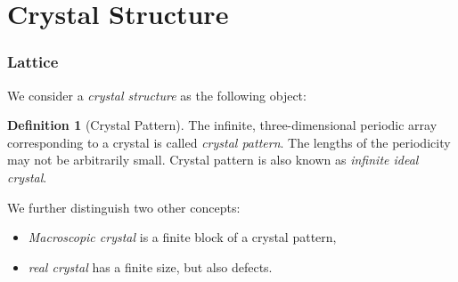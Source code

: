 \documentclass{amsart}
\newtheorem*{lemma}{Lemma}
\theoremstyle{remark}
\theoremstyle{remark}
\theoremstyle{definition}
\newtheorem*{definition}{Definition}
\DeclareMathOperator{\AO}{AO}
\begin{document}

\newpage
\part{Crystal Structure}
\section*{Lattice}
We consider a \emph{crystal structure} as the following object:
\begin{definition}
    [Crystal Pattern]
    The infinite, three-dimensional periodic array corresponding to a crystal is called \emph{crystal pattern}.
    The lengths of the periodicity may not be arbitrarily small. Crystal pattern is also known 
    as \emph{infinite ideal crystal}.
\end{definition}
We further distinguish two other concepts:
\begin{itemize}
    \item \emph{Macroscopic crystal} is a finite block of a crystal pattern,
    \item \emph{real crystal} has a finite size, but also defects.
\end{itemize}
\end{document}
